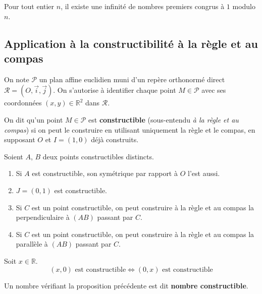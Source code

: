 	\begin{application}
		Pour tout entier $n$, il existe une infinité de nombres premiers congrus à $1$ modulo $n$.
	\end{application}

	\subsection{Application à la constructibilité à la règle et au compas}


	On note $\mathcal{P}$ un plan affine euclidien muni d'un repère orthonormé direct $\mathcal{R} = (O, \overrightarrow{i}, \overrightarrow{j})$. On s'autorise à identifier chaque point $M \in \mathcal{P}$ avec ses coordonnées $(x,y) \in \mathbb{R}^2$ dans $\mathcal{R}$.

	\begin{definition}
		On dit qu'un point $M \in \mathcal{P}$ est \textbf{constructible} (sous-entendu \textit{à la règle et au compas}) si on peut le construire en utilisant uniquement la règle et le compas, en supposant $O$ et $I=(1,0)$ déjà construits.
	\end{definition}

	\begin{proposition}
		Soient $A$, $B$ deux points constructibles distincts.
		\begin{enumerate}[label=(\roman*)]
			\item Si $A$ est constructible, son symétrique par rapport à $O$ l'est aussi.
			\item $J = (0,1)$ est constructible.
			\item Si $C$ est un point constructible, on peut construire à la règle et au compas la perpendiculaire à $(AB)$ passant par $C$.
			\item Si $C$ est un point constructible, on peut construire à la règle et au compas la parallèle à $(AB)$ passant par $C$.
		\end{enumerate}
	\end{proposition}

	\begin{proposition}
		Soit $x \in \mathbb{R}$.
		\[ (x,0) \text{ est constructible} \iff (0,x) \text{ est constructible} \]
	\end{proposition}

	\begin{definition}
		Un nombre vérifiant la proposition précédente est dit \textbf{nombre constructible}.
	\end{definition}

